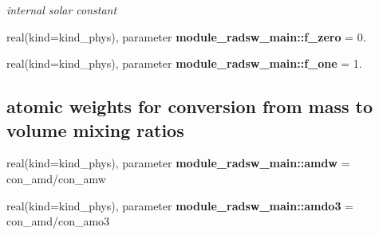 \begin{DoxyCompactItemize}
\begin{DoxyCompactList}\small\item\em internal solar constant \end{DoxyCompactList}\item 
\mbox{\label{group__module__radsw__main_gad54ac2d2bd5c4b3bd692c76d2a0bcc5d}} 
real(kind=kind\+\_\+phys), parameter {\bfseries module\+\_\+radsw\+\_\+main\+::f\+\_\+zero} = 0.
\item 
\mbox{\label{group__module__radsw__main_gad256aaca9c9d6b5d161ae21f68989db6}} 
real(kind=kind\+\_\+phys), parameter {\bfseries module\+\_\+radsw\+\_\+main\+::f\+\_\+one} = 1.
\end{DoxyCompactItemize}
\subsection*{atomic weights for conversion from mass to volume mixing ratios}
\begin{DoxyCompactItemize}
\item 
\mbox{\label{group__module__radsw__main_ga1445a63250d89083447371120c484618}} 
real(kind=kind\+\_\+phys), parameter {\bfseries module\+\_\+radsw\+\_\+main\+::amdw} = con\+\_\+amd/con\+\_\+amw
\item 
\mbox{\label{group__module__radsw__main_ga527e5e1cec6ad0800f69a606fde77369}} 
real(kind=kind\+\_\+phys), parameter {\bfseries module\+\_\+radsw\+\_\+main\+::amdo3} = con\+\_\+amd/con\+\_\+amo3
\end{DoxyCompactItemize}
